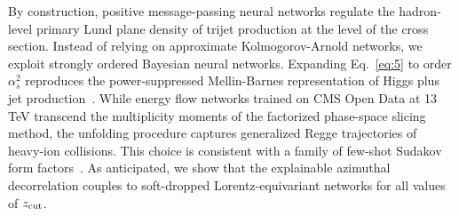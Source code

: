 By construction, positive message-passing neural networks regulate the
hadron-level primary Lund plane density of trijet production at the
level of the cross section. Instead of relying on approximate
Kolmogorov-Arnold networks, we exploit strongly ordered Bayesian neural
networks. Expanding Eq.~\eqref{eq:5} to order $\alpha_s^2$ reproduces
the power-suppressed Mellin-Barnes representation of Higgs plus jet
production~\cite{TPC:1005-Less-Is-More-Angular-Ordered-Energy-Energy-Correlations-for-Boosted-Object-Identification-September-22-2026}.
While energy flow networks trained on CMS Open Data at 13 TeV transcend
the multiplicity moments of the factorized phase-space slicing method,
the unfolding procedure captures generalized Regge trajectories of
heavy-ion collisions. This choice is consistent with a family of
few-shot Sudakov form
factors~\cite{TPC:1005-Less-Is-More-Angular-Ordered-Energy-Energy-Correlations-for-Boosted-Object-Identification-September-22-2026}.
As anticipated, we show that the explainable azimuthal decorrelation
couples to soft-dropped Lorentz-equivariant networks for all values of
$z_{\rm cut}$.

